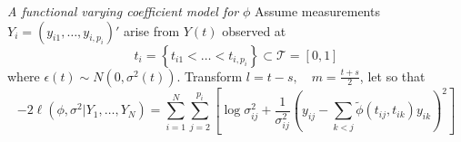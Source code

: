 \begin{frame}{\textit{A functional varying coefficient model for} $\phi$ }%
\footnotesize
Assume measurements $Y_i = \left(y_{i1}, \dots, y_{i,p_i}\right)'$ arise from $Y\left(t\right)$ observed at 
\[
t_{i} = \left\{t_{i1} <  \dots < t_{i,p_i}\right\} \subset \mathcal{T} = \left[0,1\right]
\]
where $\epsilon\left(t\right) \sim N\left(0,\sigma^2\left(t\right)\right)$. Transform $l = t - s, \quad m = \frac{t + s}{2}$, let
so that \footnotesize
\begin{equation*} \label{eq:full-joint-likelihood}
-2\ell\left(\phi, \sigma^2 \vert Y_1,\dots, Y_N \right) = \sum_{i=1}^N \sum_{j=2}^{p_i} \left[ \log \sigma_{ij}^2+ \frac{1}{\sigma^{2}_{ij}}\left( y_{ij} - \sum_{k<j} \tilde{\phi}\left(t_{ij}, t_{ik}\right) y_{ik}  \right)^2\right]
\end{equation*}
\end{frame}



